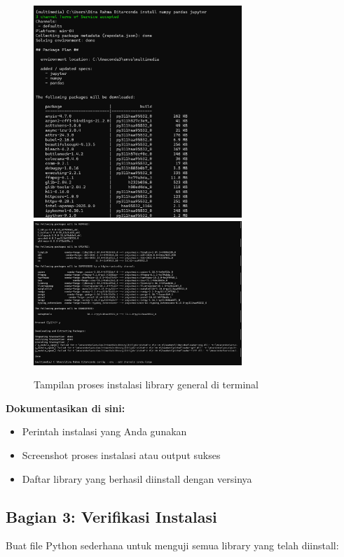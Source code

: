 \documentclass[11pt,a4paper]{article}
\begin{document}
\begin{figure}[H]
    \centering
    \includegraphics[width=0.7\textwidth]{Figure/ss/9.png}
    \includegraphics[width=0.7\textwidth]{Figure/ss/10.png}
    \caption{Tampilan proses instalasi library general di terminal}
    \label{fig:library_general}
\end{figure}

\textbf{Dokumentasikan di sini:}
\begin{itemize}
    \item Perintah instalasi yang Anda gunakan
    \item Screenshot proses instalasi atau output sukses
    \item Daftar library yang berhasil diinstall dengan versinya
\end{itemize}

\subsection{Bagian 3: Verifikasi Instalasi}
Buat file Python sederhana untuk menguji semua library yang telah diinstall:
\end{document}
